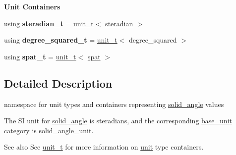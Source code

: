 \begin{Indent}{\bf Unit Containers}\par
{\em \label{namespaceunits_1_1solid__angle_solidAngleContainers}%
\hypertarget{namespaceunits_1_1solid__angle_solidAngleContainers}{}%
}\begin{DoxyCompactItemize}
\item 
\hypertarget{namespaceunits_1_1solid__angle_adf72380d1f9b9ff80f7b1a3daaacb2fd}{}using {\bfseries steradian\+\_\+t} = \hyperlink{classunits_1_1unit__t}{unit\+\_\+t}$<$ \hyperlink{structunits_1_1unit}{steradian} $>$\label{namespaceunits_1_1solid__angle_adf72380d1f9b9ff80f7b1a3daaacb2fd}

\item 
\hypertarget{namespaceunits_1_1solid__angle_add0523a95f358fb3d7c87d06af346693}{}using {\bfseries degree\+\_\+squared\+\_\+t} = \hyperlink{classunits_1_1unit__t}{unit\+\_\+t}$<$ degree\+\_\+squared $>$\label{namespaceunits_1_1solid__angle_add0523a95f358fb3d7c87d06af346693}

\item 
\hypertarget{namespaceunits_1_1solid__angle_a21104574e4682a9e1d7b3cf28e58b767}{}using {\bfseries spat\+\_\+t} = \hyperlink{classunits_1_1unit__t}{unit\+\_\+t}$<$ \hyperlink{structunits_1_1unit}{spat} $>$\label{namespaceunits_1_1solid__angle_a21104574e4682a9e1d7b3cf28e58b767}

\end{DoxyCompactItemize}
\end{Indent}


\subsection{Detailed Description}
namespace for unit types and containers representing \hyperlink{namespaceunits_1_1solid__angle}{solid\+\_\+angle} values 

The S\+I unit for \hyperlink{namespaceunits_1_1solid__angle}{solid\+\_\+angle} is {\ttfamily steradians}, and the corresponding {\ttfamily \hyperlink{structunits_1_1base__unit}{base\+\_\+unit}} category is {\ttfamily solid\+\_\+angle\+\_\+unit}. \begin{DoxySeeAlso}{See also}
See \hyperlink{classunits_1_1unit__t}{unit\+\_\+t} for more information on \hyperlink{structunits_1_1unit}{unit} type containers. 
\end{DoxySeeAlso}
